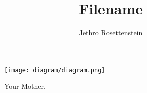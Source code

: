 \documentclass{article}
\title{Filename}
\author{Jethro Rosettenstein}
\begin{document}
\maketitle

\begin{figure}
  \texttt{[image: diagram/diagram.png]}
  \caption{Your Mother.}
\end{figure}
\end{document}
